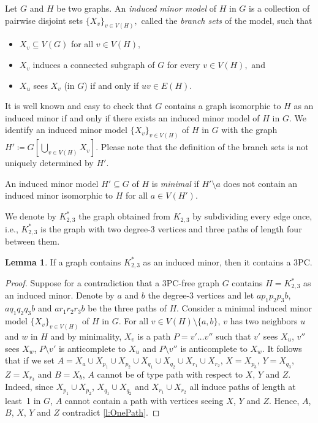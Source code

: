 \documentclass[11pt]{article}
\newcommand{\sm}{\setminus}
\theoremstyle{definition}
\newtheorem{lemma}[theorem]{Lemma}
\theoremstyle{definition}
\begin{document}
Let $G$ and $H$ be two graphs. An \emph{induced minor model} of $H$ in
$G$ is a collection of pairwise disjoint sets $\{ X_v\}_{v\in V(H)},$
called the \emph{branch sets} of the model, such that

\begin{itemize}
\item $X_v\subseteq V(G)$ for all $v\in V(H),$
\item $X_v$ induces a connected subgraph of $G$ for every $v\in V(H),$
  and
\item $X_u$ sees $X_v$ (in $G$) if and only if $uv\in E(H)$.
\end{itemize}

It is well known and easy to check that $G$ contains a graph
isomorphic to $H$ as an induced minor if and only if there exists an
induced minor model of $H$ in $G$.  We identify an induced minor model
$\{ X_v\}_{v\in V(H)}$ of $H$ in $G$ with the graph
$H'\coloneqq G[\bigcup_{v\in V(H)}X_v]$.  Please note that the
definition of the branch sets is not uniquely determined by $H'.$

An induced minor model $H'\subseteq G$ of $H$ is \emph{minimal} if
$H' \sm a$ does not contain an induced minor isomorphic to $H$ for all
$a\in V(H').$


We denote by $K^{*}_{2,3}$ the graph obtained from $K_{2,3}$ by
subdividing every edge once, i.e., $K^{*}_{2,3}$ is the graph with two
degree-3 vertices and three paths of length four between them.

\begin{lemma}
\label{lem:subk23im}
If a  graph contains $K^{*}_{2,3}$ as an induced minor,
then it contains a 3PC.
\end{lemma}

\begin{proof}
  Suppose for a contradiction that a 3PC-free graph $G$ contains
  $H = K^{*}_{2,3}$ as an induced minor.  Denote by $a$ and $b$ the
  degree-3 vertices and let $ap_1p_2p_3b$, $aq_1q_2q_3b$ and
  $ar_1r_2r_3b$ be the three paths of $H$.  Consider a minimal induced
  minor model $\{X_v\}_{v \in V(H)}$ of $H$ in $G$. For all
  $v\in V(H) \sm \{a, b\}$, $v$ has two neighbors $u$ and $w$ in $H$
  and by minimality, $X_v$ is a path $P= v'\dots v''$ such that $v'$
  sees $X_u$, $v''$ sees $X_w$, $P\sm v'$ is anticomplete to $X_u$ and
  $P\sm v''$ is anticomplete to $X_w$.  It follows that if we set
  $A= X_a \cup X_{p_1} \cup X_{p_2} \cup X_{q_1} \cup X_{q_2} \cup
  X_{r_1} \cup X_{r_2}$, $X = X_{p_3}$, $Y = X_{q_3}$, $Z = X_{r_3}$
  and $B= X_b$, $A$ cannot be of type path with respect to $X$, $Y$
  and $Z$.  Indeed, since $X_{p_1}\cup X_{p_2}$, $X_{q_1}\cup X_{q_2}$
  and $X_{r_1}\cup X_{r_2}$ all induce paths of length at least~1 in
  $G$, $A$ cannot contain a path with vertices seeing $X$, $Y$ and
  $Z$.  Hence, $A$, $B$, $X$, $Y$ and $Z$ contradict \cref{l:OnePath}.
\end{proof}
\end{document}

